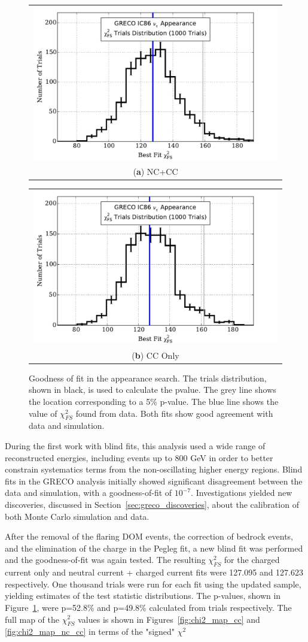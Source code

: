 \begin{figure}[h]
\centering 
\begin{tabular}[b]{c}
  \includegraphics[width=0.45\linewidth]{pvalue_nc_cc.pdf} \\
  \small (\textbf{\color{ctcolormain}a}) NC+CC
\end{tabular} \hspace{2pt}
\begin{tabular}[b]{c}
  \includegraphics[width=0.45\linewidth]{pvalue_cc.pdf} \\
  \small (\textbf{\color{ctcolormain}b}) CC Only
\end{tabular}
\caption[The goodness of fit in the appearance search]{Goodness of fit in the appearance search. The trials distribution, shown in black, is used to calculate the pvalue. The grey line shows the location corresponding to a 5\% p-value. The blue line shows the value of $\chi^2_{FS}$ found from data. Both fits show good agreement with data and simulation.}
\label{fig:pvalues}
\end{figure}

During the first work with blind fits, this analysis used a wide range of reconstructed energies, including events up to 800 GeV in order to better constrain systematics terms from the non-oscillating higher energy regions.
Blind fits in the GRECO analysis initially showed significant disagreement between the data and simulation, with a goodness-of-fit of ${10^{-7}}$.
Investigations yielded new discoveries, discussed in Section~\ref{sec:greco_discoveries}, about the calibration of both Monte Carlo simulation and data.

After the removal of the flaring DOM events, the correction of bedrock events, and the elimination of the charge in the Pegleg fit, a new blind fit was performed and the goodness-of-fit was again tested.
The resulting $\chi^2_{FS}$ for the charged current only and neutral current + charged current fits were 127.095 and 127.623 respectively.
One thousand trials were run for each fit using the updated sample, yielding estimates of the test statistic distributions.
The p-values, shown in Figure~\ref{fig:pvalues}, were p=52.8\% and  p=49.8\% calculated from trials respectively.
The full map of the ${\chi^2_{FS}}$ values is shown in Figures~\ref{fig:chi2_map_cc} and \ref{fig:chi2_map_nc_cc} in terms of the "signed" $\chi^2$

